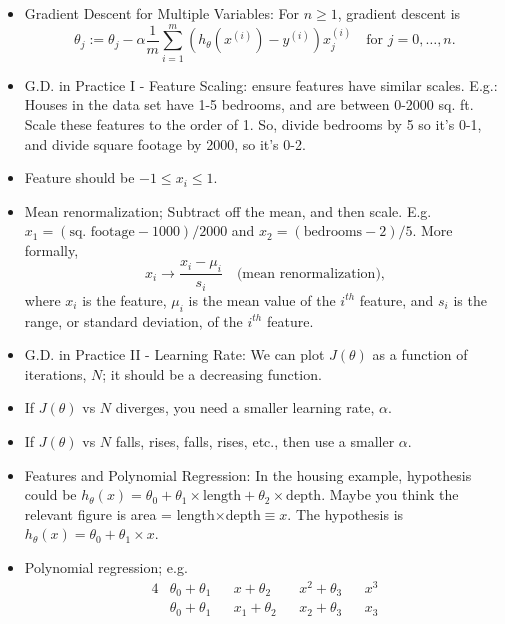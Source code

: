 \documentclass[10pt]{article}
\begin{document}
\begin{itemize}
  \item Gradient Descent for Multiple Variables: For $n \geq 1$, gradient descent is
    \begin{equation*}
      \theta_j := \theta_j - \alpha \frac{1}{m} \sum_{i=1}^m \left( h_{\theta}(x^{(i)}) - y^{(i)}\right)x_j^{(i)} \quad \text{for $j=0,\dots,n$.}
    \end{equation*}
  \item G.D. in Practice I - Feature Scaling: ensure features have
    similar scales. E.g.: Houses in the data set have 1-5 bedrooms,
    and are between 0-2000 sq. ft. Scale these features to the order
    of 1. So, divide bedrooms by 5 so it's 0-1, and divide square
    footage by 2000, so it's 0-2.
  \item Feature should be $-1 \leq x_i \leq 1$.
  \item Mean renormalization; Subtract off the mean, and then scale. E.g. $x_1= (\text{sq. footage} - 1000)/2000$ and $x_2 = (\text{bedrooms} - 2)/5$. More formally,
    \begin{equation*}
      x_i \rightarrow \frac{x_i - \mu_i}{s_i} \quad \text{(mean renormalization),}
    \end{equation*}
    where $x_i$ is the feature, $\mu_i$ is the mean value of the
    $i^{th}$ feature, and $s_i$ is the range, or standard deviation,
    of the $i^{th}$ feature.
  \item G.D. in Practice II - Learning Rate: We can plot $J(\theta)$ as a function of iterations, $N$; it should be a decreasing function.
  \item If $J(\theta)$ vs $N$ diverges, you need a smaller learning rate, $\alpha$.
  \item If $J(\theta)$ vs $N$ falls, rises, falls, rises, etc., then use a smaller $\alpha$.
  \item Features and Polynomial Regression: In the housing example,
    hypothesis could be $h_{\theta}(x) = \theta_0 + \theta_1 \times
    \text{length} + \theta_2 \times \text{depth}$.  Maybe you think
    the relevant figure is area = length$\times$depth$\equiv x$. The
    hypothesis is $h_{\theta}(x) = \theta_0 + \theta_1 \times x$.
  \item Polynomial regression; e.g. 
    \begin{alignat*}{4}
      &\theta_0 + \theta_1&&x   + \theta_2&&x^2 + \theta_3&&x^3 \\
      &\theta_0 + \theta_1&&x_1 + \theta_2&&x_2 + \theta_3&&x_3 \\

\end{alignat*}
\end{itemize}
\end{document}
